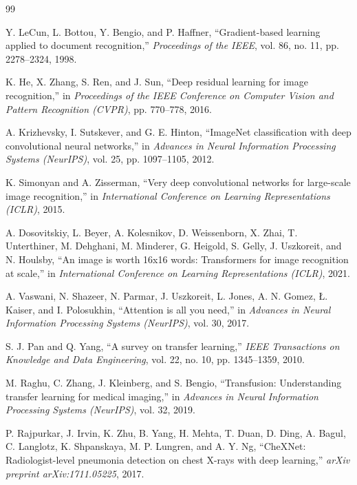 \documentclass[12pt]{report}
\begin{document}
\begin{thebibliography}{99}

Y. LeCun, L. Bottou, Y. Bengio, and P. Haffner,
``Gradient-based learning applied to document recognition,''
\textit{Proceedings of the IEEE}, vol. 86, no. 11,
pp. 2278--2324, 1998.

K. He, X. Zhang, S. Ren, and J. Sun,
``Deep residual learning for image recognition,''
in \textit{Proceedings of the IEEE Conference on Computer Vision
and Pattern Recognition (CVPR)}, pp. 770--778, 2016.

A. Krizhevsky, I. Sutskever, and G. E. Hinton,
``ImageNet classification with deep convolutional neural networks,''
in \textit{Advances in Neural Information Processing Systems
(NeurIPS)}, vol. 25, pp. 1097--1105, 2012.

K. Simonyan and A. Zisserman,
``Very deep convolutional networks for large-scale image recognition,''
in \textit{International Conference on Learning Representations
(ICLR)}, 2015.

A. Dosovitskiy, L. Beyer, A. Kolesnikov, D. Weissenborn, X. Zhai,
T. Unterthiner, M. Dehghani, M. Minderer, G. Heigold, S. Gelly,
J. Uszkoreit, and N. Houlsby,
``An image is worth 16x16 words: Transformers for image recognition
at scale,''
in \textit{International Conference on Learning Representations
(ICLR)}, 2021.

A. Vaswani, N. Shazeer, N. Parmar, J. Uszkoreit, L. Jones,
A. N. Gomez, {\L}. Kaiser, and I. Polosukhin,
``Attention is all you need,''
in \textit{Advances in Neural Information Processing Systems
(NeurIPS)}, vol. 30, 2017.

S. J. Pan and Q. Yang,
``A survey on transfer learning,''
\textit{IEEE Transactions on Knowledge and Data Engineering},
vol. 22, no. 10, pp. 1345--1359, 2010.

M. Raghu, C. Zhang, J. Kleinberg, and S. Bengio,
``Transfusion: Understanding transfer learning for medical imaging,''
in \textit{Advances in Neural Information Processing Systems
(NeurIPS)}, vol. 32, 2019.

P. Rajpurkar, J. Irvin, K. Zhu, B. Yang, H. Mehta, T. Duan,
D. Ding, A. Bagul, C. Langlotz, K. Shpanskaya, M. P. Lungren,
and A. Y. Ng,
``CheXNet: Radiologist-level pneumonia detection on chest X-rays
with deep learning,''
\textit{arXiv preprint arXiv:1711.05225}, 2017.


\end{thebibliography}
\end{document}
